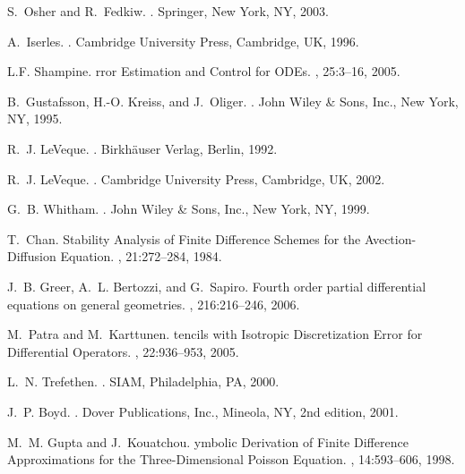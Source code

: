 \documentclass[fleqn,12pt,twoside]{article}
\begin{document}
\begin{thebibliography}{10}
S.~Osher and R.~Fedkiw.
.
\newblock Springer, New York, NY, 2003.

A.~Iserles.
.
\newblock Cambridge University Press, Cambridge, UK, 1996.

L.F. Shampine.
rror {E}stimation and {C}ontrol for {ODE}s.
, 25:3--16, 2005.

B.~Gustafsson, H.-O. Kreiss, and J.~Oliger.
.
\newblock John Wiley \& Sons, Inc., New York, NY, 1995.

R.~J. LeVeque.
.
\newblock Birkh\"auser Verlag, Berlin, 1992.

R.~J. LeVeque.
.
\newblock Cambridge University Press, Cambridge, UK, 2002.

G.~B. Whitham.
.
\newblock John Wiley \& Sons, Inc., New York, NY, 1999.

T.~Chan.
\newblock Stability {A}nalysis of {F}inite {D}ifference {S}chemes for the
  {A}vection-{D}iffusion {E}quation.
, 21:272--284, 1984.

J.~B. Greer, A.~L. Bertozzi, and G.~Sapiro.
\newblock Fourth order partial differential equations on general geometries.
, 216:216--246, 2006.

M.~Patra and M.~Karttunen.
tencils with {I}sotropic {D}iscretization {E}rror for
  {D}ifferential {O}perators.
, 22:936--953, 2005.

L.~N. Trefethen.
.
\newblock SIAM, Philadelphia, PA, 2000.

J.~P. Boyd.
.
\newblock Dover Publications, Inc., Mineola, NY, 2nd edition, 2001.

M.~M. Gupta and J.~Kouatchou.
ymbolic {D}erivation of {F}inite {D}ifference {A}pproximations for
  the {T}hree-{D}imensional {P}oisson {E}quation.
, 14:593--606, 1998.

\end{thebibliography}
\end{document}
